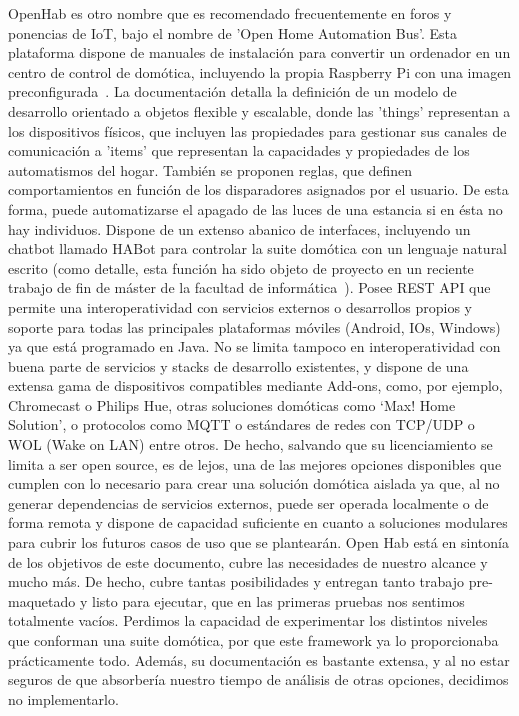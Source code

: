 OpenHab es otro nombre que es recomendado frecuentemente en foros y ponencias de IoT, bajo el nombre de 'Open Home Automation Bus'. Esta plataforma dispone de manuales de instalación para convertir un ordenador en un centro de control de domótica, incluyendo la propia Raspberry Pi con una imagen preconfigurada~\cite{openHabRaspberryPi}. La documentación detalla la definición de un modelo de desarrollo orientado a objetos flexible y escalable, donde las 'things' representan a los dispositivos físicos, que incluyen las propiedades para gestionar sus canales de comunicación a 'items' que representan la capacidades y propiedades de los automatismos del hogar. También se proponen reglas, que definen comportamientos en función de los disparadores asignados por el usuario. De esta forma, puede automatizarse el apagado de las luces de una estancia si en ésta no hay individuos. Dispone de un extenso abanico de interfaces, incluyendo un chatbot llamado HABot para controlar la suite domótica con un lenguaje natural escrito (como detalle, esta función ha sido objeto de proyecto en un reciente trabajo de fin de máster de la facultad de informática~\cite{eprint49443}). Posee REST API que permite una interoperatividad con servicios externos o desarrollos propios y soporte para todas las principales plataformas móviles (Android, IOs, Windows) ya que está programado en Java. No se limita tampoco en interoperatividad con buena parte de servicios y stacks de desarrollo existentes, y dispone de una extensa gama de dispositivos compatibles mediante Add-ons, como, por ejemplo, Chromecast o Philips Hue, otras soluciones domóticas como ‘Max! Home Solution’, o protocolos como MQTT o estándares de redes con TCP/UDP o WOL (Wake on LAN) entre otros. De hecho, salvando que su licenciamiento se limita a ser open source, es de lejos, una de las mejores opciones disponibles que cumplen con lo necesario para crear una solución domótica aislada ya que, al no generar dependencias de servicios externos, puede ser operada localmente o de forma remota y dispone de capacidad suficiente en cuanto a soluciones modulares para cubrir los futuros casos de uso que se plantearán. Open Hab está en sintonía de los objetivos de este documento, cubre las necesidades de nuestro alcance y mucho más. De hecho, cubre tantas posibilidades y entregan tanto trabajo pre-maquetado y listo para ejecutar, que en las primeras pruebas nos sentimos totalmente vacíos. Perdimos la capacidad de experimentar los distintos niveles que conforman una suite domótica, por que este framework ya lo proporcionaba prácticamente todo. Además, su documentación es bastante extensa, y al no estar seguros de que absorbería nuestro tiempo de análisis de otras opciones, decidimos no implementarlo.

